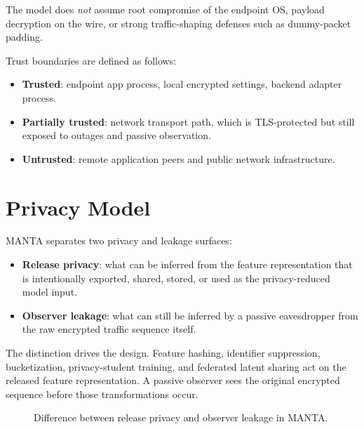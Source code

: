 The model does \emph{not} assume root compromise of the endpoint OS, payload decryption on the wire,
or strong traffic-shaping defenses such as dummy-packet padding.

Trust boundaries are defined as follows:
\begin{itemize}[leftmargin=*]
  \item \textbf{Trusted}: endpoint app process, local encrypted settings, backend adapter process.
  \item \textbf{Partially trusted}: network transport path, which is TLS-protected but still exposed
  to outages and passive observation.
  \item \textbf{Untrusted}: remote application peers and public network infrastructure.
\end{itemize}

\section{Privacy Model}
MANTA separates two privacy and leakage surfaces:
\begin{itemize}[leftmargin=*]
  \item \textbf{Release privacy}: what can be inferred from the feature representation that is
  intentionally exported, shared, stored, or used as the privacy-reduced model input.
  \item \textbf{Observer leakage}: what can still be inferred by a passive eavesdropper from the raw
  encrypted traffic sequence itself.
\end{itemize}

The distinction drives the design. Feature hashing, identifier suppression, bucketization,
privacy-student training, and federated latent sharing act on the released feature representation.
A passive observer sees the original encrypted sequence before those transformations occur.

\begin{figure}[htbp]
  \centering
  \caption{Difference between release privacy and observer leakage in MANTA.}
  \label{fig:privacy-surfaces}
\end{figure}

